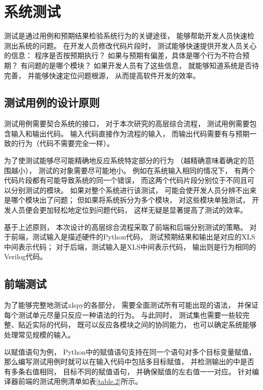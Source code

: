 \section{系统测试}

测试是通过用例和预期结果检验系统行为的关键途径，
能够帮助开发人员快速检测出系统的问题。
在开发人员修改代码片段时，
测试能够快速提供开发人员关心的信息：
程序是否按预期执行？
如果与预期有偏差，具体是哪个行为不符合预期？
有问题的是哪个模块？
如果开发人员有了这些信息，
就能够知道系统是否待完善，
并能够快速定位问题根源，
从而提高软件开发的效率。

\subsection{测试用例的设计原则}

测试用例需要契合系统的接口，
对于本次研究的高层综合流程，
测试用例需要包含输入和输出代码。
输入代码直接作为流程的输入，
而输出代码需要有与预期一致的行为（代码不需要完全一样）。

为了使测试能够尽可能精确地反应系统特定部分的行为
（越精确意味着确定的范围越小），
测试的对象需要尽可能地小。
例如在系统输入相同的情况下，
有两个代码片段都有可能导致系统的同一个错误，
而这两个代码片段分别位于不同且可以分别测试的模块。
如果对整个系统进行该测试，
可能会使开发人员分辨不出来是哪个模块出了问题；
但如果将系统拆分为多个模块，
对这些模块单独测试，
开发人员便会更加轻松地定位到问题代码，
这样无疑是显著提高了测试的效率。

基于上述原则，
本次设计的高层综合流程采取了前端和后端分别测试的策略。
对于前端，测试输入是描述硬件的Python代码，
测试预期结果和输出是对应的XLS中间表示代码；
对于后端，测试输入是XLS中间表示代码，
输出则是行为相同的Verilog代码。

\subsection{前端测试}

为了能够完整地测试xlspy的各部分，
需要全面测试所有可能出现的语法，
并保证每个测试单元尽量只反应一种语法的行为。
与此同时，
测试集也需要一些较完整、贴近实际的代码，
既可以反应各模块之间的协同能力，
也可以确定系统能够处理常见规模的输入。

以赋值语句为例，
Python中的赋值语句支持在同一个语句对多个目标变量赋值，
那么编写测试用例时就可以在输入代码中包括多目标赋值，
并检测输出的中是否有多条右值相同，
目标不同的赋值语句，
并确保赋值的左右值一一对应。
针对编译器前端的测试用例清单如表\ref{table.2}所示。

